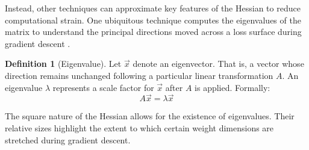 \documentclass{article}
\theoremstyle{definition}
\newtheorem{definition}{Definition}[section]
\begin{document}
Instead, other techniques can approximate key features of the Hessian to reduce computational strain. One ubiquitous technique computes the eigenvalues of the matrix to understand the principal directions moved across a loss surface during gradient descent \cite{eigenintuition}. 
\begin{definition}[Eigenvalue]
\label{eigenvaluedefinition}
    Let $\Vec{x}$ denote an eigenvector. That is, a vector whose direction remains unchanged following a particular linear transformation $A$. An eigenvalue $\lambda$ represents a scale factor for $\Vec{x}$ after $A$ is applied. 
    Formally:
    \[
        A\Vec{x} = \lambda\Vec{x}
    \]
\end{definition}
The square nature of the Hessian allows for the existence of eigenvalues. Their relative sizes highlight the extent to which certain weight dimensions are stretched during gradient descent.
\end{document}
